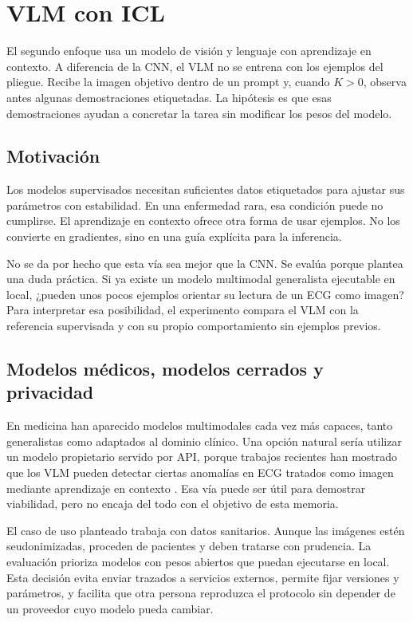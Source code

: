 \section{VLM con ICL}
\label{chap:vlm}

El segundo enfoque usa un modelo de visión y lenguaje con aprendizaje en contexto. A diferencia de la CNN, el VLM no se entrena con los ejemplos del pliegue. Recibe la imagen objetivo dentro de un prompt y, cuando \(K>0\), observa antes algunas demostraciones etiquetadas. La hipótesis es que esas demostraciones ayudan a concretar la tarea sin modificar los pesos del modelo.

\subsection{Motivación}

Los modelos supervisados necesitan suficientes datos etiquetados para ajustar sus parámetros con estabilidad. En una enfermedad rara, esa condición puede no cumplirse. El aprendizaje en contexto ofrece otra forma de usar ejemplos. No los convierte en gradientes, sino en una guía explícita para la inferencia.

No se da por hecho que esta vía sea mejor que la CNN. Se evalúa porque plantea una duda práctica. Si ya existe un modelo multimodal generalista ejecutable en local, ¿pueden unos pocos ejemplos orientar su lectura de un ECG como imagen? Para interpretar esa posibilidad, el experimento compara el VLM con la referencia supervisada y con su propio comportamiento sin ejemplos previos.

\subsection{Modelos médicos, modelos cerrados y privacidad}

En medicina han aparecido modelos multimodales cada vez más capaces, tanto generalistas como adaptados al dominio clínico. Una opción natural sería utilizar un modelo propietario servido por API, porque trabajos recientes han mostrado que los VLM pueden detectar ciertas anomalías en ECG tratados como imagen mediante aprendizaje en contexto \cite{camba2026icl}. Esa vía puede ser útil para demostrar viabilidad, pero no encaja del todo con el objetivo de esta memoria.

El caso de uso planteado trabaja con datos sanitarios. Aunque las imágenes estén seudonimizadas, proceden de pacientes y deben tratarse con prudencia. La evaluación prioriza modelos con pesos abiertos que puedan ejecutarse en local. Esta decisión evita enviar trazados a servicios externos, permite fijar versiones y parámetros, y facilita que otra persona reproduzca el protocolo sin depender de un proveedor cuyo modelo pueda cambiar.

